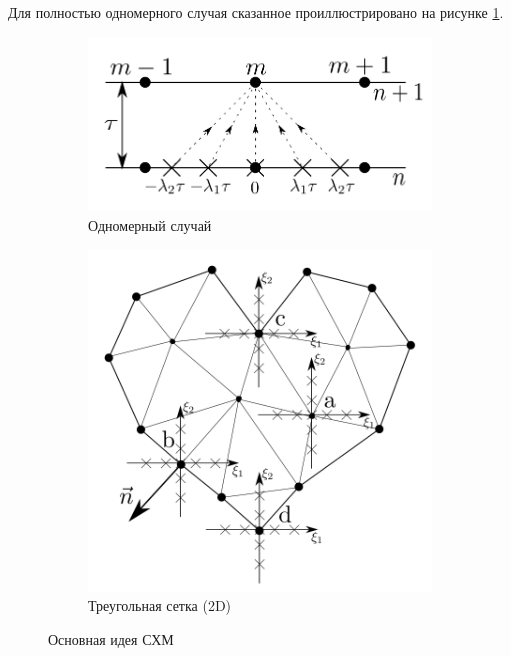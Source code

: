 \documentclass[a4paper]{article}
\numberwithin{equation}{section}
\begin{document}
Для полностью одномерного случая 
сказанное проиллюстрировано на рисунке \ref{pic:gcm-idea}.
\begin{figure}[H]
\centering
\begin{subfigure}{.5\textwidth}
  \centering
  \includegraphics[width=1.0\linewidth]{pictures/gcm-idea.png}
  \caption{Одномерный случай}
  \label{pic:gcm-idea}
\end{subfigure}
\hfill
\begin{subfigure}{.4\textwidth}
  \centering
  \includegraphics[width=1.0\linewidth]{pictures/gcm-on-triangles.png}
  \caption{Треугольная сетка (2D)}
  \label{pic:gcm-on-triangles}
\end{subfigure}
\caption{Основная идея СХМ}
\end{figure}
\end{document}
